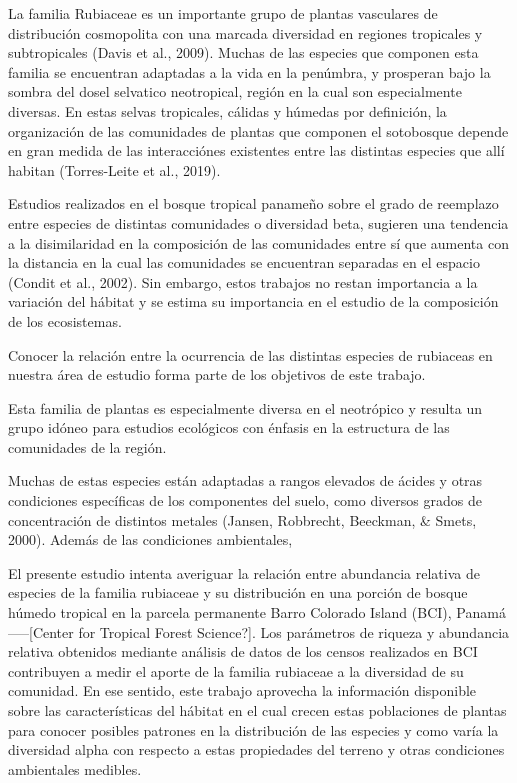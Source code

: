 \documentclass[11pt,]{article}
\begin{document}
La familia Rubiaceae es un importante grupo de plantas vasculares de
distribución cosmopolita con una marcada diversidad en regiones
tropicales y subtropicales (Davis et al., 2009). Muchas de las especies
que componen esta familia se encuentran adaptadas a la vida en la
penúmbra, y prosperan bajo la sombra del dosel selvatico neotropical,
región en la cual son especialmente diversas. En estas selvas
tropicales, cálidas y húmedas por definición, la organización de las
comunidades de plantas que componen el sotobosque depende en gran medida
de las interacciónes existentes entre las distintas especies que allí
habitan (Torres-Leite et al., 2019).

Estudios realizados en el bosque tropical panameño sobre el grado de
reemplazo entre especies de distintas comunidades o diversidad beta,
sugieren una tendencia a la disimilaridad en la composición de las
comunidades entre sí que aumenta con la distancia en la cual las
comunidades se encuentran separadas en el espacio (Condit et al., 2002).
Sin embargo, estos trabajos no restan importancia a la variación del
hábitat y se estima su importancia en el estudio de la composición de
los ecosistemas.

Conocer la relación entre la ocurrencia de las distintas especies de
rubiaceas en nuestra área de estudio forma parte de los objetivos de
este trabajo.

Esta familia de plantas es especialmente diversa en el neotrópico y
resulta un grupo idóneo para estudios ecológicos con énfasis en la
estructura de las comunidades de la región.

Muchas de estas especies están adaptadas a rangos elevados de ácides y
otras condiciones específicas de los componentes del suelo, como
diversos grados de concentración de distintos metales (Jansen,
Robbrecht, Beeckman, \& Smets, 2000). Además de las condiciones
ambientales,

El presente estudio intenta averiguar la relación entre abundancia
relativa de especies de la familia rubiaceae y su distribución en una
porción de bosque húmedo tropical en la parcela permanente Barro
Colorado Island (BCI), Panamá-----{[}Center for Tropical Forest
Science?{]}. Los parámetros de riqueza y abundancia relativa obtenidos
mediante análisis de datos de los censos realizados en BCI contribuyen a
medir el aporte de la familia rubiaceae a la diversidad de su comunidad.
En ese sentido, este trabajo aprovecha la información disponible sobre
las características del hábitat en el cual crecen estas poblaciones de
plantas para conocer posibles patrones en la distribución de las
especies y como varía la diversidad alpha con respecto a estas
propiedades del terreno y otras condiciones ambientales medibles.
\end{document}
